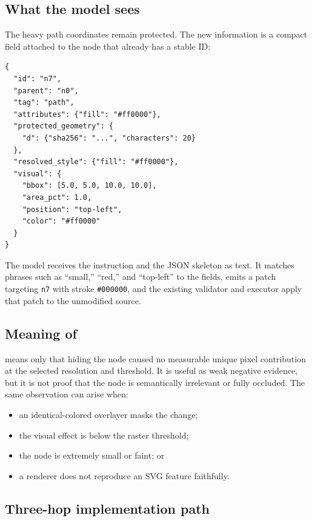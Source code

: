 \documentclass[10pt,a4paper]{article}
\newcommand{\code}[1]{\texttt{\detokenize{#1}}}
\begin{document}
\subsection{What the model sees}

The heavy path coordinates remain protected. The new information is a compact
field attached to the node that already has a stable ID:

\begin{lstlisting}[style=compact,language={}]
{
  "id": "n7",
  "parent": "n0",
  "tag": "path",
  "attributes": {"fill": "#ff0000"},
  "protected_geometry": {
    "d": {"sha256": "...", "characters": 20}
  },
  "resolved_style": {"fill": "#ff0000"},
  "visual": {
    "bbox": [5.0, 5.0, 10.0, 10.0],
    "area_pct": 1.0,
    "position": "top-left",
    "color": "#ff0000"
  }
}
\end{lstlisting}

The model receives the instruction and the JSON skeleton as text. It matches
phrases such as ``small,'' ``red,'' and ``top-left'' to the fields, emits a
patch targeting \texttt{n7} with stroke \texttt{\#000000}, and the existing
validator and executor apply that patch to the unmodified source.

\subsection{Meaning of \code{visible:false}}

\code{visible:false} means only that hiding the node caused no measurable
unique pixel contribution at the selected resolution and threshold. It is
useful as weak negative evidence, but it is not proof that the node is
semantically irrelevant or fully occluded. The same observation can arise when:

\begin{itemize}
  \item an identical-colored overlayer masks the change;
  \item the visual effect is below the raster threshold;
  \item the node is extremely small or faint; or
  \item a renderer does not reproduce an SVG feature faithfully.
\end{itemize}

\subsection{Three-hop implementation path}
\end{document}
